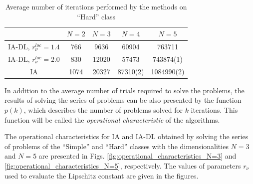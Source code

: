 \documentclass[preprint]{elsarticle}
\begin{document}
\begin{table}[h!]
	\centering
		\begin{tabular}{ccccc}
			\hline
			& $N=2$ & $N=3$ & $N=4$ & $N=5$ \\
			\hline
			IA-DL, $r_{\nu}^{loc}=1.4$ & 766 & 9636 & 60904 & 763711 \\
			\hline
			IA-DL, $r_{\nu}^{loc}=2.0$ & 830 & 12020 & 57473 & 743874(1) \\
			\hline
			IA & 1074 & 20327 & 87310(2) & 1084990(2) \\
			\hline
		\end{tabular}
	\caption{Average number of iterations performed by the methods on “Hard” class}
	\label{tab:average_number_of_iterations_hard}
\end{table}

	In addition to the average number of trials required to solve the problems, the results of solving the series of problems can be also presented by the function $p(k)$, which describes the number of problems solved for $k$ iterations. This function will be called the \textit{operational characteristic} of the algorithms.
	
	The operational characteristics for IA and IA-DL obtained by solving the series of problems of the “Simple” and “Hard” classes with the dimensionalities $N=3$ and $N=5$ are presented in Figs. \ref{fig:operational_characteristics_N=3} and \ref{fig:operational_characteristics_N=5}, respectively. The values of parameters $r_{\nu}$ used to evaluate the Lipschitz constant are given in the figures.
\end{document}
